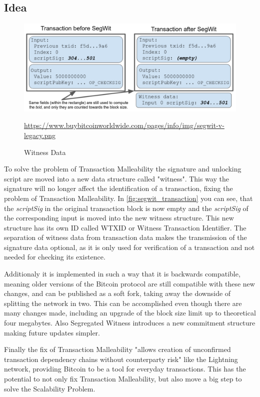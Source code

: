 \subsection{Idea}
\label{sec:SegWit:Idea}
\begin{figure}[!ht]
    \centering
    \includegraphics[width=(\textwidth * 2 / 3 )]{Ausarbeitung/images/SegWitTransactionChanges.png}
    \caption[Witness Data]{Witness Data}
    \small \url{https://www.buybitcoinworldwide.com/pages/info/img/segwit-v-legacy.png} 
    \label{fig:segwit_transaction}
\end{figure}
To solve the problem of Transaction Malleability the signature and unlocking script are moved into a new data structure called "witness". This way the signature will no longer affect the identification of a transaction, fixing the problem of Transaction Malleability. In \autoref{fig:segwit_transaction} you can see, that the \textit{scriptSig} in the original transaction block is now empty and the \textit{scriptSig} of the corresponding input is moved into the new witness structure. This new structure has its own ID called WTXID or Witness Transaction Identifier. The separation of witness data from transaction data makes the transmission of the signature data optional, as it is only used for verification of a transaction and not needed for checking its existence.

Additionaly it is implemented in such a way that it is backwards compatible, meaning older versions of the Bitcoin protocol are still compatible with these new changes, and can be published as a soft fork, taking away the downside of splitting the network in two. This can be accomplished even though there are many changes made, including an upgrade of the block size limit up to theoretical four megabytes. Also Segregated Witness introduces a new commitment structure making future updates simpler.

Finally the fix of Transaction Malleability "allows creation of unconfirmed transaction dependency chains without counterparty risk" \cite{bip-141} like the Lightning network, providing Bitcoin to be a tool for everyday transactions. This has the potential to not only fix Transaction Malleability, but also move a big step to solve the Scalability Problem.


